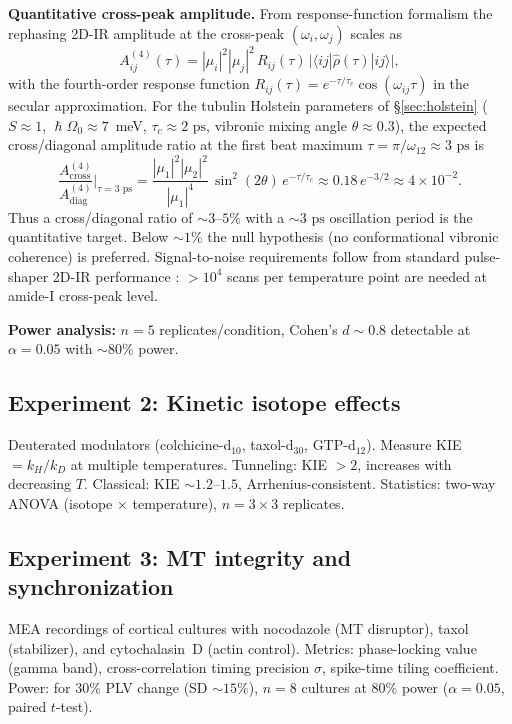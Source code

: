 \documentclass[twocolumn,10pt]{article}
\renewcommand{\hbar}{\hslash}
\newcommand{\ps}{\text{~ps}}
\begin{document}
\textbf{Quantitative cross-peak amplitude.} From response-function
formalism \cite{Mukamel1995} the rephasing 2D-IR amplitude at the
cross-peak $(\omega_i,\omega_j)$ scales as
\begin{equation}
A_{ij}^{(4)}(\tau)=|\mu_i|^2|\mu_j|^2\,
R_{ij}(\tau)\,\bigl|\langle ij|\hat\rho(\tau)|ij\rangle\bigr|,
\end{equation}
with the fourth-order response function
$R_{ij}(\tau)=e^{-\tau/\tau_c}\cos(\omega_{ij}\tau)$ in the secular
approximation. For the tubulin Holstein parameters of
\S\ref{sec:holstein} ($S\approx 1$, $\hbar\Omega_0\approx 7$~meV,
$\tau_c\approx 2\ps$, vibronic mixing angle $\theta\approx 0.3$), the
expected cross/diagonal amplitude ratio at the first beat maximum
$\tau=\pi/\omega_{12}\approx 3\ps$ is
\begin{equation}
\frac{A^{(4)}_{\text{cross}}}{A^{(4)}_{\text{diag}}}\Bigg|_{\tau=3\ps}
=\frac{|\mu_1|^2|\mu_2|^2}{|\mu_1|^4}\,\sin^2(2\theta)\,e^{-\tau/\tau_c}
\approx 0.18\,e^{-3/2}\approx 4\times 10^{-2}.
\end{equation}
Thus a cross/diagonal ratio of $\sim 3\text{--}5\%$ with a $\sim 3\ps$
oscillation period is the quantitative target. Below $\sim 1\%$ the null
hypothesis (no conformational vibronic coherence) is preferred.
Signal-to-noise requirements follow from standard pulse-shaper 2D-IR
performance \cite{Hamm2011}: $>10^4$ scans per temperature point are
needed at amide-I cross-peak level.


\textbf{Power analysis:} $n=5$ replicates/condition, Cohen's $d \sim 0.8$
detectable at $\alpha = 0.05$ with $\sim 80\%$ power.


\subsection{Experiment 2: Kinetic isotope effects}

Deuterated modulators (colchicine-d$_{10}$, taxol-d$_{30}$, GTP-d$_{12}$).
Measure KIE $= k_H/k_D$ at multiple temperatures. Tunneling: KIE $> 2$,
increases with decreasing $T$. Classical: KIE $\sim 1.2\text{--}1.5$,
Arrhenius-consistent. Statistics: two-way ANOVA (isotope $\times$
temperature), $n = 3 \times 3$ replicates.


\subsection{Experiment 3: MT integrity and synchronization}
\label{sec:exp3}

MEA recordings of cortical cultures with nocodazole (MT disruptor), taxol
(stabilizer), and cytochalasin~D (actin control). Metrics: phase-locking
value (gamma band), cross-correlation timing precision $\sigma$,
spike-time tiling coefficient. Power: for 30\% PLV change (SD $\sim 15\%$),
$n = 8$ cultures at 80\% power ($\alpha = 0.05$, paired $t$-test).
\end{document}
